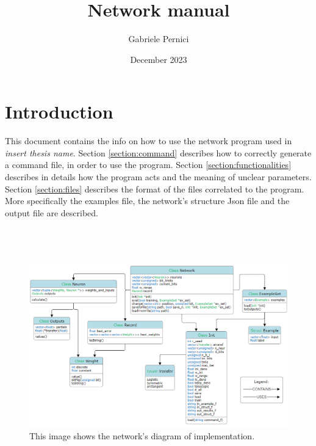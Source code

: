 \documentclass{article}
\title{Network manual}
\author{Gabriele Pernici}
\date{December 2023}
\begin{document}
\maketitle

\section{Introduction}
This document contains the info on how to use the network program used in \textit{insert thesis name}. Section \ref{section:command} describes how to correctly generate a command file, in order to use the program. Section \ref{section:functionalities} describes in details how the program acts and the meaning of unclear parameters. Section \ref{section:files} describes the format of the files correlated to the program. More specifically the examples file, the network's structure Json file and the output file are described.
\\ \\ \\ \\
\begin{figure}[h]
    \label{img:diagram}
    \centering
    \includegraphics[width=1.0\textwidth]{NetworkStructure.PNG}
    \caption{This image shows the network's diagram of implementation.}
\end{figure}


\newpage
\end{document}
